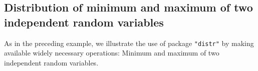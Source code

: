 \documentclass[11pt]{article}
\begin{document}
\subsection{Distribution of minimum and maximum of two independent random variables}\label{minmaxex}
\begin{small}
As in the preceding example, we illustrate the use of package {\tt "distr"} by
 making available widely necessary operations: Minimum and maximum of two 
 independent random variables.
\end{small}
\end{document}
